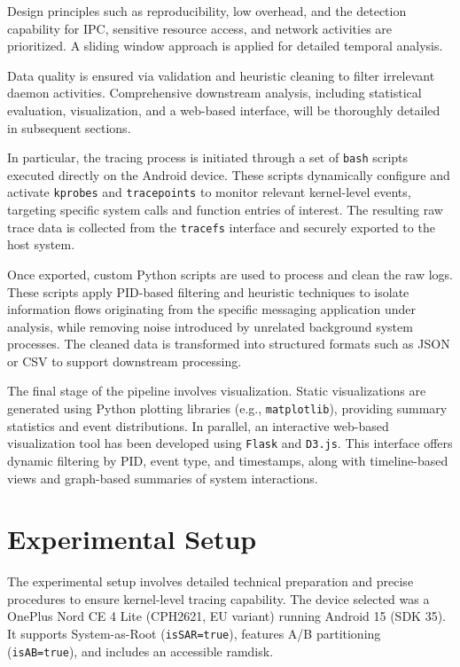 \documentclass[a4paper,12pt]{report}
\begin{document}
Design principles such as reproducibility, low overhead, and the detection capability for IPC, sensitive resource access, and network activities are prioritized. A sliding window approach is applied for detailed temporal analysis.

Data quality is ensured via validation and heuristic cleaning to filter irrelevant daemon activities. Comprehensive downstream analysis, including statistical evaluation, visualization, and a web-based interface, will be thoroughly detailed in subsequent sections.

In particular, the tracing process is initiated through a set of \texttt{bash} scripts executed directly on the Android device. These scripts dynamically configure and activate \texttt{kprobes} and \texttt{tracepoints} to monitor relevant kernel-level events, targeting specific system calls and function entries of interest. The resulting raw trace data is collected from the \texttt{tracefs} interface and securely exported to the host system.

Once exported, custom Python scripts are used to process and clean the raw logs. These scripts apply PID-based filtering and heuristic techniques to isolate information flows originating from the specific messaging application under analysis, while removing noise introduced by unrelated background system processes. The cleaned data is transformed into structured formats such as JSON or CSV to support downstream processing.

The final stage of the pipeline involves visualization. Static visualizations are generated using Python plotting libraries (e.g., \texttt{matplotlib}), providing summary statistics and event distributions. In parallel, an interactive web-based visualization tool has been developed using \texttt{Flask} and \texttt{D3.js}. This interface offers dynamic filtering by PID, event type, and timestamps, along with timeline-based views and graph-based summaries of system interactions.
\section{Experimental Setup}

The experimental setup involves detailed technical preparation and precise procedures to ensure kernel-level tracing capability. The device selected was a OnePlus Nord CE 4 Lite (CPH2621, EU variant) running Android 15 (SDK 35). It supports System-as-Root (\texttt{isSAR=true}), features A/B partitioning (\texttt{isAB=true}), and includes an accessible ramdisk.
\end{document}

